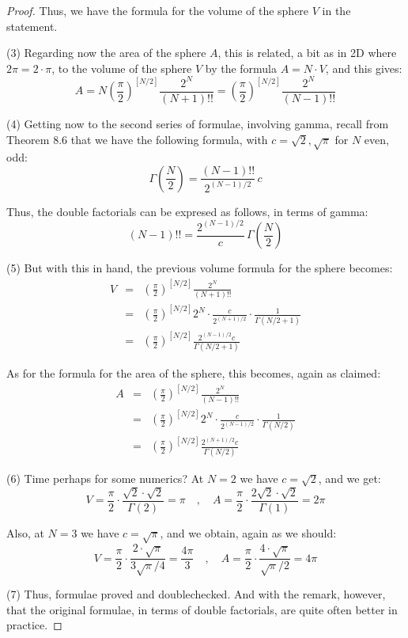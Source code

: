\documentclass[12pt]{amsbook}
\begin{document}
\begin{proof}
Thus, we have the formula for the volume of the sphere $V$ in the statement.

\medskip

(3) Regarding now the area of the sphere $A$, this is related, a bit as in 2D where $2\pi=2\cdot\pi$, to the volume of the sphere $V$ by the formula $A=N\cdot V$, and this gives: 
$$A=N\left(\frac{\pi}{2}\right)^{[N/2]}\frac{2^N}{(N+1)!!}=\left(\frac{\pi}{2}\right)^{[N/2]}\frac{2^N}{(N-1)!!}$$

(4) Getting now to the second series of formulae, involving gamma, recall from Theorem 8.6 that we have the following formula, with $c=\sqrt{2},\sqrt{\pi}$ for $N$ even, odd:
$$\Gamma\left(\frac{N}{2}\right)=\frac{(N-1)!!}{2^{(N-1)/2}}\,c$$

Thus, the double factorials can be expresed as follows, in terms of gamma:
$$(N-1)!!=\frac{2^{(N-1)/2}}{c}\,\Gamma\left(\frac{N}{2}\right)$$

(5) But with this in hand, the previous volume formula for the sphere becomes:
\begin{eqnarray*}
V
&=&\left(\frac{\pi}{2}\right)^{[N/2]}\frac{2^N}{(N+1)!!}\\
&=&\left(\frac{\pi}{2}\right)^{[N/2]}2^N\cdot\frac{c}{2^{(N+1)/2}}\cdot\frac{1}{\Gamma(N/2+1)}\\
&=&\left(\frac{\pi}{2}\right)^{[N/2]}\frac{2^{(N-1)/2}c}{\Gamma(N/2+1)}
\end{eqnarray*}

As for the formula for the area of the sphere, this becomes, again as claimed:
\begin{eqnarray*}
A
&=&\left(\frac{\pi}{2}\right)^{[N/2]}\frac{2^N}{(N-1)!!}\\
&=&\left(\frac{\pi}{2}\right)^{[N/2]}2^N\cdot\frac{c}{2^{(N-1)/2}}\cdot\frac{1}{\Gamma(N/2)}\\
&=&\left(\frac{\pi}{2}\right)^{[N/2]}\frac{2^{(N+1)/2}c}{\Gamma(N/2)}
\end{eqnarray*}

(6) Time perhaps for some numerics? At $N=2$ we have $c=\sqrt{2}$, and we get:
$$V=\frac{\pi}{2}\cdot\frac{\sqrt{2}\cdot\sqrt{2}}{\Gamma(2)}=\pi
\quad,\quad A=\frac{\pi}{2}\cdot\frac{2\sqrt{2}\cdot\sqrt{2}}{\Gamma(1)}=2\pi$$

Also, at $N=3$ we have $c=\sqrt{\pi}$, and we obtain, again as we should:
$$V=\frac{\pi}{2}\cdot\frac{2\cdot\sqrt{\pi}}{3\sqrt{\pi}/4}=\frac{4\pi}{3}
\quad,\quad A=\frac{\pi}{2}\cdot\frac{4\cdot\sqrt{\pi}}{\sqrt{\pi}/2}=4\pi$$

(7) Thus, formulae proved and doublechecked. And with the remark, however, that the original formulae, in terms of double factorials, are quite often better in practice.
\end{proof}
\end{document}
